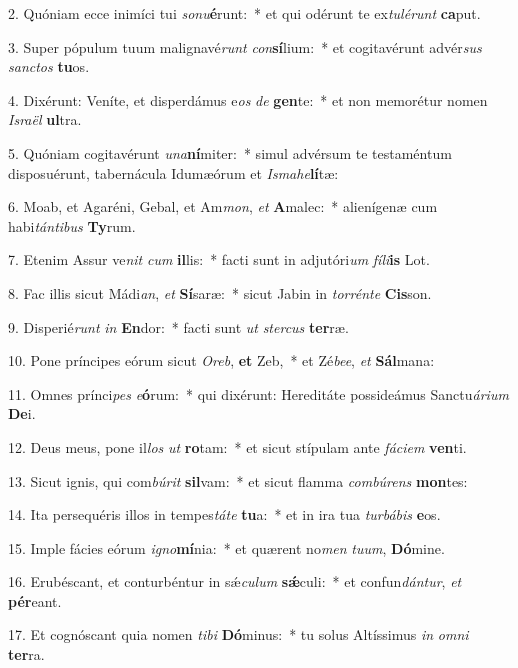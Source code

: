 2. Quóniam ecce inimíci tui \textit{so}\textit{nu}\textbf{é}runt:~*  et qui odérunt te ex\textit{tu}\textit{lé}\textit{runt} \textbf{ca}put.\

3. Super pópulum tuum malignavé\textit{runt} \textit{con}\textbf{sí}lium:~*  et cogitavérunt advér\textit{sus} \textit{sanc}\textit{tos} \textbf{tu}os.\

4. Dixérunt: Veníte, et disperdámus e\textit{os} \textit{de} \textbf{gen}te:~*  et non memorétur nomen \textit{Is}\textit{ra}\textit{ël} \textbf{ul}tra.\

5. Quóniam cogitavérunt \textit{u}\textit{na}\textbf{ní}miter:~*  simul advérsum te testaméntum disposuérunt, tabernácula Idumæórum et \textit{Is}\textit{ma}\textit{he}\textbf{lí}tæ:\

6. Moab, et Agaréni, Gebal, et Am\textit{mon}, \textit{et} \textbf{A}malec:~*  alienígenæ cum habi\textit{tán}\textit{ti}\textit{bus} \textbf{Ty}rum.\

7. Etenim Assur ve\textit{nit} \textit{cum} \textbf{il}lis:~*  facti sunt in adjutóri\textit{um} \textit{fí}\textit{li}\textbf{is} Lot.\

8. Fac illis sicut Mádi\textit{an}, \textit{et} \textbf{Sí}saræ:~*  sicut Jabin in \textit{tor}\textit{rén}\textit{te} \textbf{Cis}son.\

9. Disperié\textit{runt} \textit{in} \textbf{En}dor:~*  facti sunt \textit{ut} \textit{ster}\textit{cus} \textbf{ter}ræ.\

10. Pone príncipes eórum sicut \textit{O}\textit{reb}, \textbf{et} Zeb,~*  et Zé\textit{be}\textit{e}, \textit{et} \textbf{Sál}mana:\

11. Omnes prínci\textit{pes} \textit{e}\textbf{ó}rum:~*  qui dixérunt: Hereditáte possideámus Sanctu\textit{á}\textit{ri}\textit{um} \textbf{De}i.\

12. Deus meus, pone il\textit{los} \textit{ut} \textbf{ro}tam:~*  et sicut stípulam ante \textit{fá}\textit{ci}\textit{em} \textbf{ven}ti.\

13. Sicut ignis, qui com\textit{bú}\textit{rit} \textbf{sil}vam:~*  et sicut flamma \textit{com}\textit{bú}\textit{rens} \textbf{mon}tes:\

14. Ita persequéris illos in tempes\textit{tá}\textit{te} \textbf{tu}a:~*  et in ira tua \textit{tur}\textit{bá}\textit{bis} \textbf{e}os.\

15. Imple fácies eórum \textit{i}\textit{gno}\textbf{mí}nia:~*  et quærent no\textit{men} \textit{tu}\textit{um}, \textbf{Dó}mine.\

16. Erubéscant, et conturbéntur in sǽ\textit{cu}\textit{lum} \textbf{sǽ}culi:~*  et confun\textit{dán}\textit{tur}, \textit{et} \textbf{pér}eant.\

17. Et cognóscant quia nomen \textit{ti}\textit{bi} \textbf{Dó}minus:~*  tu solus Altíssimus \textit{in} \textit{om}\textit{ni} \textbf{ter}ra.\

